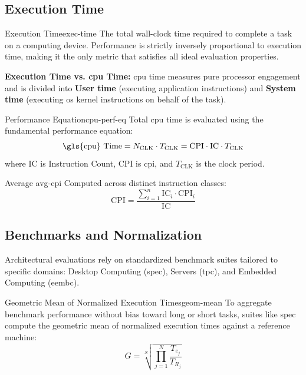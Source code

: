 \subsection{Execution Time}
\begin{definition}{Execution Time}{exec-time}
    The total wall-clock time required to complete a task on a computing device. Performance is strictly inversely proportional to execution time, making it the only metric that satisfies all ideal evaluation properties.
\end{definition}

\noindent \textbf{Execution Time vs. \gls{cpu} Time:} \gls{cpu} time measures pure processor engagement and is divided into \textbf{User time} (executing application instructions) and \textbf{System time} (executing \gls{os} kernel instructions on behalf of the task).

\begin{definition}{ Performance Equation}{cpu-perf-eq}
    Total \gls{cpu} time is evaluated using the fundamental performance equation:
    \[
        \text{\gls{cpu} Time} = N_{\text{CLK}} \cdot T_{\text{CLK}} = \text{CPI} \cdot \text{IC} \cdot T_{\text{CLK}}
    \]
    where \(\text{IC}\) is Instruction Count, \(\text{CPI}\) is \gls{cpi}, and \(T_{\text{CLK}}\) is the clock period.
\end{definition}

\begin{definition}{Average }{avg-cpi}
    Computed across distinct instruction classes:
    \[
        \text{CPI} = \frac{\sum_{i=1}^n \text{IC}_i \cdot \text{CPI}_i}{\text{IC}}
    \]
\end{definition}

\subsection{Benchmarks and Normalization}
Architectural evaluations rely on standardized benchmark suites tailored to specific domains: Desktop Computing (\gls{spec}), Servers (\gls{tpc}), and Embedded Computing (\gls{eembc}).

\begin{definition}{Geometric Mean of Normalized Execution Times}{geom-mean}
    To aggregate benchmark performance without bias toward long or short tasks, suites like \gls{spec} compute the geometric mean of normalized execution times against a reference machine:
    \[
        G = \sqrt[N]{\prod_{j=1}^N \frac{T_{e_j}}{T_{R_j}}}
    \]
\end{definition}

